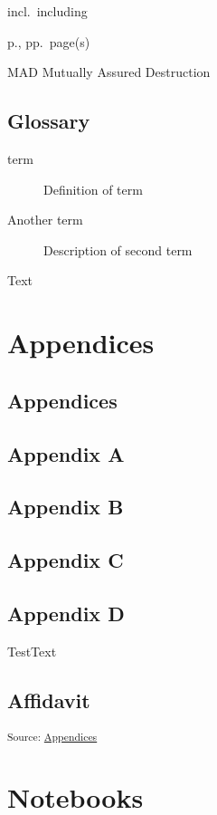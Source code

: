 \documentclass[12pt,a4paper]{report}      %
\begin{document}
incl.~including

p., pp.~page(s)

MAD Mutually Assured Destruction

\section*{Glossary}\label{glossary}

\begin{description}
\item[term]
Definition of term
\item[Another term]
Description of second term
\end{description}

Text

\chapter{Appendices}\label{appendices}

\section{Appendices}\label{appendices-1}

\section{Appendix A}\label{appendix-a}

\section{Appendix B}\label{appendix-b}

\section{Appendix C}\label{appendix-c}

\section{Appendix D}\label{appendix-d}

TestText

\section{Affidavit}\label{affidavit}

\textsubscript{Source:
\href{https://VJMeyer.github.io/submission/chapters/Appendices.qmd.html\#23997cc1-3a93-4cef-89c1-6b6ba523207a}{Appendices}}

\chapter*{Notebooks}\label{notebooks}
\end{document}
